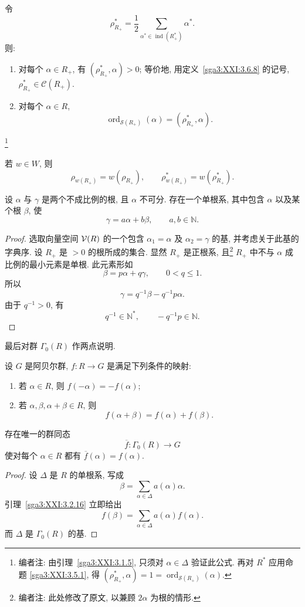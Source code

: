 \begin{corollary}\label{sga3:XXI:3.5.2}
令
\[
 \rho_{R_+}^\ast
   =\frac12
     \sum_{\alpha^\ast\in\operatorname{ind}(R_+^\ast)}
     \alpha^\ast.
\]
则:
\begin{enumerate}
\item[(i)] 对每个 \(\alpha\in R_+\), 有 \((\rho_{R_+}^\ast,\alpha)>0\); 等价地, 用定义~\ref{sga3:XXI:3.6.8} 的记号, \(\rho_{R_+}^\ast\in\mathcal{C}(R_+)\).
\item[(ii)] 对每个 \(\alpha\in R\),
  \[
   \operatorname{ord}_{\mathscr{S}(R_+)}(\alpha)
      =(\rho_{R_+}^\ast,\alpha).
  \]
\end{enumerate}
\footnote{编者注: 由引理~\ref{sga3:XXI:3.1.5}, 只须对 \(\alpha\in\Delta\) 验证此公式. 再对 \(R^\ast\) 应用命题 \ref{sga3:XXI:3.5.1}, 得 \((\rho_{R_+}^\ast,\alpha)=1=\operatorname{ord}_{\mathscr{S}(R_+)}(\alpha)\).}
\end{corollary}

\begin{remark}\label{sga3:XXI:3.5.3}
若 \(w\in W\), 则
\[
 \rho_{w(R_+)}=w(\rho_{R_+}),
 \qquad
 \rho_{w(R_+)}^\ast=w(\rho_{R_+}^\ast).
\]
\end{remark}

\begin{proposition}\label{sga3:XXI:3.5.4}
设 \(\alpha\) 与 \(\gamma\) 是两个不成比例的根, 且 \(\alpha\) 不可分. 存在一个单根系, 其中包含 \(\alpha\) 以及某个根 \(\beta\), 使
\[
 \gamma=a\alpha+b\beta,
 \qquad a,b\in\mathbb{N}.
\]
\end{proposition}
\begin{proof}
选取向量空间 \(\mathcal{V}(R)\) 的一个包含 \(\alpha_1=\alpha\) 及 \(\alpha_2=\gamma\) 的基, 并考虑关于此基的字典序. 设 \(R_+\) 是 \(>0\) 的根所成的集合. 显然 \(R_+\) 是正根系, 且\footnote{编者注: 此处修改了原文, 以兼顾 \(2\alpha\) 为根的情形.} \(R_+\) 中不与 \(\alpha\) 成比例的最小元素是单根. 此元素形如
\[
 \beta=p\alpha+q\gamma,
 \qquad 0<q\le1.
\]
所以
\[
 \gamma=q^{-1}\beta-q^{-1}p\alpha.
\]
由于 \(q^{-1}>0\), 有
\[
 q^{-1}\in\mathbb{N}^{\ast},
 \qquad
 -q^{-1}p\in\mathbb{N}.
\]
\end{proof}

最后对群 \(\Gamma_0(R)\) 作两点说明.
\begin{proposition}\label{sga3:XXI:3.5.5}
设 \(G\) 是阿贝尔群, \(f:R\to G\) 是满足下列条件的映射:
\begin{enumerate}
\item[(i)] 若 \(\alpha\in R\), 则 \(f(-\alpha)=-f(\alpha)\);
\item[(ii)] 若 \(\alpha,\beta,\alpha+\beta\in R\), 则
  \[
   f(\alpha+\beta)=f(\alpha)+f(\beta).
  \]
\end{enumerate}
存在唯一的群同态
\[
 \overline f:\Gamma_0(R)\longrightarrow G
\]
使对每个 \(\alpha\in R\) 都有 \(\overline f(\alpha)=f(\alpha)\).
\end{proposition}
\begin{proof}
设 \(\Delta\) 是 \(R\) 的单根系, 写成
\[
 \beta=\sum_{\alpha\in\Delta}a(\alpha)\alpha.
\]
引理~\ref{sga3:XXI:3.2.16} 立即给出
\[
 f(\beta)=\sum_{\alpha\in\Delta}a(\alpha)f(\alpha).
\]
而 \(\Delta\) 是 \(\Gamma_0(R)\) 的基.
\end{proof}

